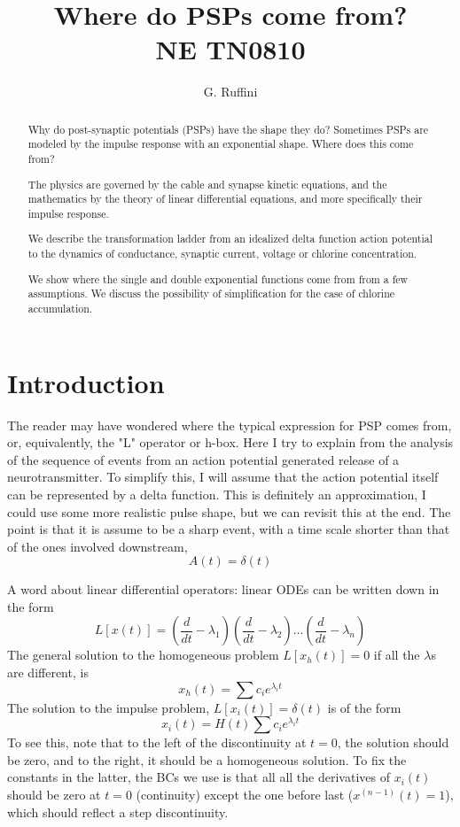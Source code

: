 \documentclass[11pt,oneside]{amsart}
\title[NE TN0180]{Where do PSPs come from? \\  NE TN0810}
\author{G. Ruffini}
\begin{document}
\maketitle

\begin{abstract}
\normalsize
    Why do post-synaptic potentials (PSPs) have the shape they do? 
Sometimes PSPs are modeled by the impulse response with an exponential shape. Where does this come from?

The physics are governed by the cable and synapse kinetic equations, and the mathematics by the theory of linear differential equations, and more specifically their impulse response. 

We describe the transformation ladder from an idealized delta function action potential to the dynamics of conductance, synaptic current, voltage or chlorine concentration.

We show where the single and double exponential functions come from from a few assumptions. We discuss the possibility of simplification for the case of chlorine accumulation. 

\end{abstract}

\tableofcontents


\clearpage
\section{Introduction}
\label{sec:introduction}
The reader may have wondered where the typical expression for PSP  comes from, or, equivalently, the "L" operator or h-box.  Here I try to explain from the analysis of the sequence of events from an action potential generated release of a neurotransmitter. To simplify this, I will assume that the action potential itself can be represented by a delta function. This is definitely an approximation, I could use some more realistic pulse shape, but we can revisit this at the end. The point is that it is assume to be a sharp event, with a time scale shorter than that of the ones involved downstream, 
\begin{equation}
A(t) = \delta(t)
\end{equation}

A word about linear differential operators: linear ODEs can be written down in the form
$$
L[x(t)] = (\frac{d}{dt} -\lambda_1)(\frac{d}{dt} -\lambda_2)...(\frac{d}{dt} -\lambda_n)
$$
The general solution to the homogeneous problem $L[x_h(t)]=0$ if all the $\lambda$s are different, is 
$$
x_h(t) = \sum c_i e^{\lambda_i t}
$$
The solution to the impulse problem, $L[x_i(t)] = \delta(t)$ is of the form
$$
x_i(t) = H(t)\sum c_i e^{\lambda_i t}
$$
To see this, note that to the left of the discontinuity at $t=0$, the solution should be zero, and to the right, it should be a homogeneous solution. To fix the constants in the latter, the BCs we use is that all all the derivatives of $x_i(t)$ should be zero at $t=0$ (continuity) except the one before last ($x^{(n-1)}(t)=1$), which should reflect a step discontinuity. 
\end{document}
